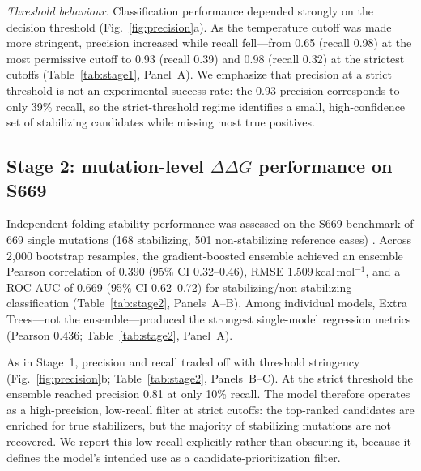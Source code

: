 \documentclass[sn-nature]{sn-jnl}%
\newcommand{\ddg}{\ensuremath{\Delta\Delta G}}
\begin{document}
\emph{Threshold behaviour.} Classification performance depended strongly on the decision
threshold (Fig.~\ref{fig:precision}a). As the temperature cutoff was made more stringent,
precision increased while recall fell---from 0.65 (recall 0.98) at the most permissive
cutoff to 0.93 (recall 0.39) and 0.98 (recall 0.32) at the strictest cutoffs
(Table~\ref{tab:stage1}, Panel~A). We emphasize that precision at a strict threshold is not
an experimental success rate: the 0.93 precision corresponds to only 39\% recall, so the
strict-threshold regime identifies a small, high-confidence set of stabilizing candidates
while missing most true positives.

\subsection{Stage 2: mutation-level \texorpdfstring{\ddg}{ddG} performance on S669}\label{sec:stage2}
Independent folding-stability performance was assessed on the S669 benchmark of 669 single
mutations (168 stabilizing, 501 non-stabilizing reference cases) \cite{pancotti2022s669}.
Across 2{,}000 bootstrap resamples, the gradient-boosted ensemble achieved an ensemble
Pearson correlation of 0.390 (95\% CI 0.32--0.46), RMSE 1.509\,kcal\,mol$^{-1}$, and a ROC
AUC of 0.669 (95\% CI 0.62--0.72) for stabilizing/non-stabilizing classification
(Table~\ref{tab:stage2}, Panels~A--B). Among individual models, Extra Trees---not the
ensemble---produced the strongest single-model regression metrics (Pearson 0.436;
Table~\ref{tab:stage2}, Panel~A).

As in Stage~1, precision and recall traded off with threshold stringency
(Fig.~\ref{fig:precision}b; Table~\ref{tab:stage2}, Panels~B--C). At the strict threshold
the ensemble reached precision 0.81 at only 10\% recall. The model therefore operates as a
high-precision, low-recall filter at strict cutoffs: the top-ranked candidates are enriched
for true stabilizers, but the majority of stabilizing mutations are not recovered. We
report this low recall explicitly rather than obscuring it, because it defines the model's
intended use as a candidate-prioritization filter.
\end{document}
